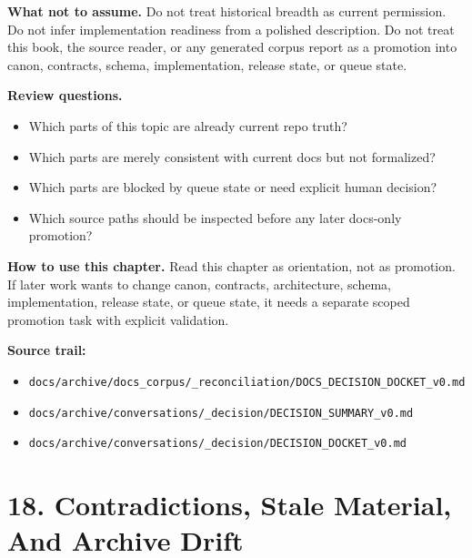 \documentclass[10.5pt,a4paper,openany]{book}
\begin{document}
\textbf{What not to assume.} Do not treat historical breadth as current permission.\allowbreak{} Do not infer implementation readiness from a polished description.\allowbreak{} Do not treat this book, the source reader, or any generated corpus report as a promotion into canon, contracts, schema, implementation, release state, or queue state.\allowbreak{}


\textbf{Review questions.}


\begin{itemize}
\item Which parts of this topic are already current repo truth?
\item Which parts are merely consistent with current docs but not formalized?
\item Which parts are blocked by queue state or need explicit human decision?
\item Which source paths should be inspected before any later docs-\allowbreak{}only promotion?
\end{itemize}

\textbf{How to use this chapter.} Read this chapter as orientation, not as promotion.\allowbreak{} If later work wants to change canon, contracts, architecture, schema, implementation, release state, or queue state, it needs a separate scoped promotion task with explicit validation.\allowbreak{}


\textbf{Source trail:}


\begin{itemize}
\item \texttt{docs/\allowbreak{}archive/\allowbreak{}docs\_\allowbreak{}corpus/\allowbreak{}\_\allowbreak{}reconciliation/\allowbreak{}DOCS\_\allowbreak{}DECISION\_\allowbreak{}DOCKET\_\allowbreak{}v0.\allowbreak{}md}
\item \texttt{docs/\allowbreak{}archive/\allowbreak{}conversations/\allowbreak{}\_\allowbreak{}decision/\allowbreak{}DECISION\_\allowbreak{}SUMMARY\_\allowbreak{}v0.\allowbreak{}md}
\item \texttt{docs/\allowbreak{}archive/\allowbreak{}conversations/\allowbreak{}\_\allowbreak{}decision/\allowbreak{}DECISION\_\allowbreak{}DOCKET\_\allowbreak{}v0.\allowbreak{}md}
\end{itemize}


\section{18. Contradictions, Stale Material, And Archive Drift}
\end{document}
